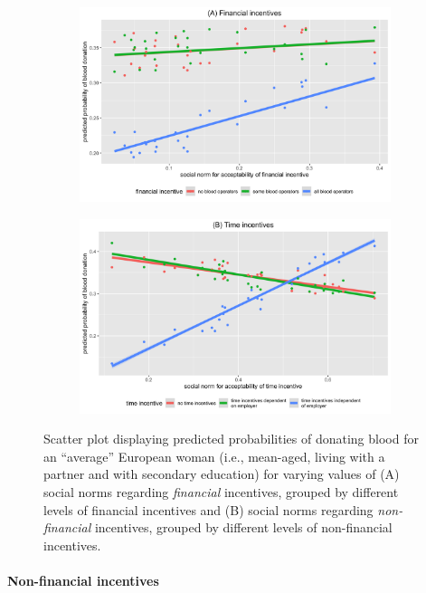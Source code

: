\documentclass[AER]{AEA}
\begin{document}
\begin{figure}[H]
\begin{subfigure}{\textwidth}
  \centering
  \includegraphics[width=.8\linewidth]{images/pred_SOC_incentives_financial_raw.png}  
\end{subfigure}
\begin{subfigure}{\textwidth}
  \centering
  \includegraphics[width=.8\linewidth]{images/pred_SOC_incentives_time_raw.png}  
\end{subfigure}
\caption{Scatter plot displaying predicted probabilities of donating blood for an “average” European woman (i.e., mean-aged, living with a partner and with secondary education) for varying values of (A) social norms regarding \textit{financial} incentives, grouped by different levels of financial incentives and (B) social norms regarding \textit{non-financial} incentives, grouped by different levels of non-financial incentives.}
\label{fig:interactions}
\end{figure}


\paragraph{Non-financial incentives}
\end{document}

